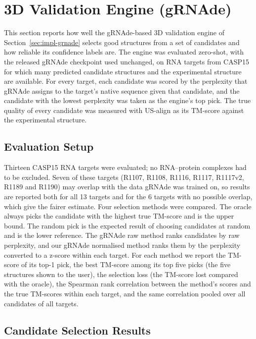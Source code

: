 \documentclass{FastFyp}
\begin{document}
\section{3D Validation Engine (gRNAde)}
\label{sec:res-grnade}
This section reports how well the gRNAde-based 3D validation engine of Section~\ref{sec:impl-grnade} selects good structures from a set of candidates and how reliable its confidence labels are. The engine was evaluated zero-shot, with the released gRNAde checkpoint used unchanged, on RNA targets from CASP15 for which many predicted candidate structures and the experimental structure are available. For every target, each candidate was scored by the perplexity that gRNAde assigns to the target's native sequence given that candidate, and the candidate with the lowest perplexity was taken as the engine's top pick. The true quality of every candidate was measured with US-align as its TM-score against the experimental structure.

\subsection{Evaluation Setup}
Thirteen CASP15 RNA targets were evaluated; no RNA--protein complexes had to be excluded. Seven of these targets (R1107, R1108, R1116, R1117, R1117v2, R1189 and R1190) may overlap with the data gRNAde was trained on, so results are reported both for all 13 targets and for the 6 targets with no possible overlap, which give the fairer estimate. Four selection methods were compared. The oracle always picks the candidate with the highest true TM-score and is the upper bound. The random pick is the expected result of choosing candidates at random and is the lower reference. The gRNAde raw method ranks candidates by raw perplexity, and our gRNAde normalised method ranks them by the perplexity converted to a z-score within each target. For each method we report the TM-score of its top-1 pick, the best TM-score among its top five picks (the five structures shown to the user), the selection loss (the TM-score lost compared with the oracle), the Spearman rank correlation between the method's scores and the true TM-scores within each target, and the same correlation pooled over all candidates of all targets.

\subsection{Candidate Selection Results}
\end{document}
